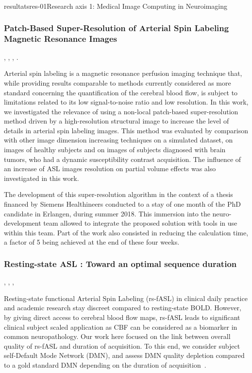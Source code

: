 \documentclass{ra2018}
\begin{document}
\begin{module}{resultats}{res-01}{Research axis 1: Medical Image Computing in Neuroimaging}
\subsubsection{Patch-Based Super-Resolution of Arterial Spin Labeling Magnetic Resonance Images}
\begin{participants}
      , 
      , 
      ,
      .
\end{participants}
Arterial spin labeling is a magnetic resonance perfusion imaging technique that, while providing results comparable to methods currently considered as more standard concerning the quantification of the cerebral blood flow, is subject to limitations related to its low signal-to-noise ratio and low resolution. In this work, we investigated the relevance of using a non-local patch-based super-resolution method driven by a high-resolution structural image to increase the level of details in arterial spin labeling images. This method was evaluated by comparison with other image dimension increasing techniques on a simulated dataset, on images of healthy subjects and on images of subjects diagnosed with brain tumors, who had a dynamic susceptibility contrast acquisition. The influence of an increase of ASL images resolution on partial volume effects was also investigated in this work.~\cite{meuree:inserm-01880726}

The development of this super-resolution algorithm in the context of a thesis financed by Siemens Healthineers conducted to a stay of one month of the PhD candidate in Erlangen, during summer 2018. This immersion into the neuro-development team allowed to integrate the proposed solution with tools in use within this team. Part of the work also consisted in reducing the calculation time, a factor of 5 being achieved at the end of these four weeks.

\subsubsection{Resting-state ASL : Toward an optimal sequence duration}
\begin{participants}
      , 
      ,
      ,
\end{participants}
Resting-state functional Arterial Spin Labeling (rs-fASL) in clinical daily practice and academic research stay discreet compared to resting-state BOLD. However, by giving direct access to cerebral blood flow maps, rs-fASL leads to significant clinical subject scaled application as CBF can be considered as a biomarker in common neuropathology. Our work here focused on the link between overall quality of rs-fASL and duration of acquisition. To this end, we consider subject self-Default Mode Network (DMN), and assess DMN quality depletion compared to a gold standard DMN depending on the duration of acquisition~\cite{vallee:inserm-01935089}.



\end{module}
\end{document}
